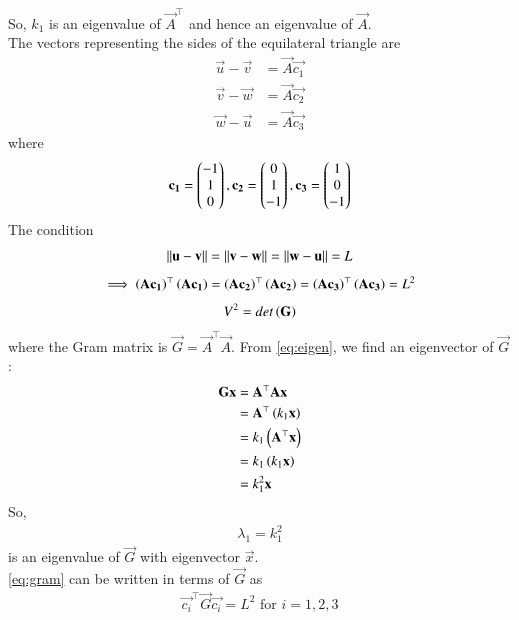 \documentclass[journal]{IEEEtran}
\begin{document}
So, $k_1$ is an eigenvalue of $\vec{A}^\top$ and hence an eigenvalue of $\vec{A}$. \\
The vectors representing the sides of the equilateral triangle are
\begin{align}
    \vec{u} - \vec{v} &= \vec{A}\vec{c_1} \label{eq:1} \\
    \vec{v} - \vec{w} &= \vec{A}\vec{c_2} \label{eq:2} \\
    \vec{w} - \vec{u} &= \vec{A}\vec{c_3} \label{eq:3}
\end{align}
where 
\begin{align}
	\mathbf{c_1} = \begin{pmatrix}-1 \\ 1 \\ 0\end{pmatrix}, \mathbf{c_2} = \begin{pmatrix}0 \\ 1 \\ -1\end{pmatrix}, \mathbf{c_3} = \begin{pmatrix}1 \\ 0 \\ -1\end{pmatrix}
\end{align}
The condition 
\begin{align}
	\left\lVert\mathbf{u} - \mathbf{v}\right\rVert = \left\lVert\mathbf{v} - \mathbf{w}\right\rVert = \left\lVert\mathbf{w} - \mathbf{u}\right\rVert = L
\end{align}
\begin{align}
    \implies \left(\mathbf{A}\mathbf{c_1}\right)^\top\left(\mathbf{A}\mathbf{c_1}\right) = \left(\mathbf{A}\mathbf{c_2}\right)^\top\left(\mathbf{A}\mathbf{c_2}\right) = \left(\mathbf{A}\mathbf{c_3}\right)^\top\left(\mathbf{A}\mathbf{c_3}\right) = L^2 \label{eq:gram}
\end{align}
\begin{align}
    V^2 = det\left(\mathbf{G}\right) 
\end{align}
where the Gram matrix is $\vec{G} = \vec{A}^\top\vec{A}$. From \eqref{eq:eigen}, we find an eigenvector of $\vec{G}$:
\begin{align}
    \mathbf{G}\mathbf{x} &= \mathbf{A}^\top\mathbf{A}\mathbf{x} \\
    &= \mathbf{A}^\top\left(k_1\mathbf{x}\right) \\
    &= k_1\left(\mathbf{A}^\top\mathbf{x}\right) \\
    &= k_1\left(k_1\mathbf{x}\right) \\
    &= k_1^2\mathbf{x}
\end{align}
So, 
\begin{align}
	\lambda_1 = k_1^2
\end{align} is an eigenvalue of $\vec{G}$ with eigenvector $\vec{x}$. \\
\eqref{eq:gram} can be written in terms of $\vec{G}$ as
\begin{align}
    \vec{c_i}^\top \vec{G} \vec{c_i} = L^2 \text{ for } i=1,2,3 \label{eq:list}
\end{align}
\end{document}
